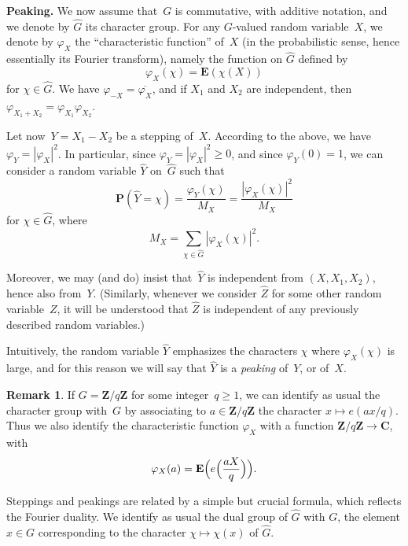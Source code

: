 \documentclass[12pt]{amsart}
\renewcommand{\geq}{\geqslant}
\numberwithin{equation}{section}
\newcommand{\Cc}{\mathbf{C}}
\newcommand{\Zz}{\mathbf{Z}}
\newcommand{\proba}{\mathbf{P}}
\newcommand{\expect}{\mathbf{E}}
\theoremstyle{plain}
\theoremstyle{remark}
\theoremstyle{definition}
\newtheorem{remark}[theorem]{Remark}
\renewcommand{\geq}{\geqslant}
\begin{document}
\par
\medskip
\par

\textbf{Peaking.} We now assume that~$G$ is commutative, with additive
notation, and we denote by $\widehat{G}$ its character group. For any
$G$-valued random variable~$X$, we denote by $\varphi_X$ the
``characteristic function'' of~$X$ (in the probabilistic sense, hence
essentially its Fourier transform), namely the function on $\widehat{G}$
defined by
$$
\varphi_X(\chi)=\expect(\chi(X))
$$
for $\chi\in\widehat{G}$. We have $\varphi_{-X}=\overline{\varphi_X}$,
and if $X_1$ and $X_2$ are independent, then
$\varphi_{X_1+X_2}=\varphi_{X_1}\varphi_{X_2}$.

Let now~$Y=X_1-X_2$ be a stepping of~$X$. According to the above, we
have~$\varphi_Y=|\varphi_X|^2$.  In particular, since
$\varphi_Y=|\varphi_X|^2\geq 0$, and since $\varphi_Y(0)=1$, we can
consider a random variable $\widehat{Y}$ on~$\widehat{G}$ such that
$$
\proba(\widehat{Y}=\chi)=\frac{\varphi_Y(\chi)}{M_X}=
\frac{|\varphi_X(\chi)|^2}{M_X}
$$
for $\chi\in\widehat{G}$, where
$$
M_X=\sum_{\chi\in \widehat{G}}|\varphi_X(\chi)|^2.
$$

Moreover, we may (and do) insist that~$\widehat{Y}$ is independent from
$(X,X_1,X_2)$, hence also from~$Y$.  (Similarly, whenever we consider
$\widehat{Z}$ for some other random variable~$Z$, it will be understood
that $\widehat{Z}$ is independent of any previously described random
variables.)

Intuitively, the random variable $\widehat{Y}$ emphasizes the characters
$\chi$ where $\varphi_X(\chi)$ is large, and for this reason we will say
that $\widehat{Y}$ is a \emph{peaking} of~$Y$, or of~$X$.

\begin{remark}
  If $G=\Zz/q\Zz$ for some integer~$q\geq 1$, we can identify as usual
  the character group with~$G$ by associating to $a\in\Zz/q\Zz$ the
  character $x\mapsto e(ax/q)$. Thus we also identify the characteristic
  function $\varphi_X$ with a function $\Zz/q\Zz\to \Cc$, with
  $$
  \varphi_X(a)=\expect\Bigl(e\Bigl(\frac{aX}{q}\Bigr)\Bigr).
  $$
\end{remark}

Steppings and peakings are related by a simple but crucial formula,
which reflects the Fourier duality. We identify as usual the dual group
of $\widehat{G}$ with $G$, the element $x\in G$ corresponding to the
character $\chi\mapsto \chi(x)$ of $\widehat{G}$. 
\end{document}
